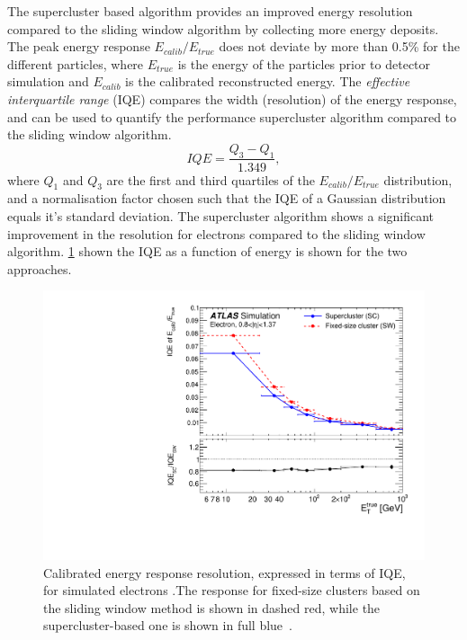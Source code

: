 The supercluster based algorithm provides an improved energy resolution compared to the sliding window algorithm by collecting more energy deposits. The peak energy response $E_{calib}/E_{true}$ does not deviate by more than 0.5\% for the different particles, where $E_{true}$ is the energy of the particles prior to detector simulation and $E_{calib}$ is the calibrated reconstructed energy. The \emph{effective interquartile range} (IQE) compares the width (resolution) of the energy response, and can be used to quantify the performance supercluster algorithm compared to the sliding window algorithm. 
\begin{equation}
    IQE = \frac{Q_3 - Q_1}{1.349},
\end{equation}
where $Q_1$ and $Q_3$ are the first and third quartiles of the $E_{calib}/E_{true}$ distribution, and a normalisation factor chosen such that the IQE of a Gaussian distribution equals it's standard deviation. The supercluster algorithm shows a significant improvement in the resolution for electrons compared to the sliding window algorithm. \cref{fig:method:iqe} shown the IQE as a function of energy is shown for the two approaches. 
\begin{figure}[]
    \centering
    \includegraphics[width=\mediumfigwidth]{images/IQE_reco_1.pdf}
    \caption[Calibrated energy response resolution, expressed in terms of IQE, for simulated electrons]{Calibrated energy response resolution, expressed in terms of IQE, for simulated electrons .The response for fixed-size clusters based on the sliding window method is shown in dashed red, while the supercluster-based one is shown in full blue~\cite{Aad:2019tso}.}
    \label{fig:method:iqe}
\end{figure}

